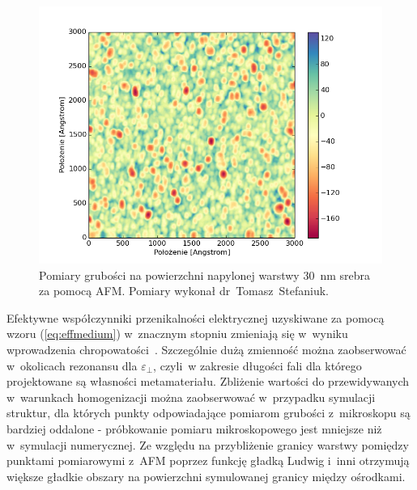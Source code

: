 \begin{figure}[bt]
		\includegraphics[width=\textwidth]{images/multilayer/ag30nm-afm-measure.png}
		\caption{Pomiary grubości na powierzchni napylonej warstwy $30$~nm srebra za pomocą AFM. Pomiary wykonał dr~Tomasz~Stefaniuk.} 
		\label{fig:ag30nm-afmmeasure}
\end{figure}


Efektywne współczynniki przenikalności elektrycznej uzyskiwane za pomocą wzoru (\ref{eq:effmedium}) w~znacznym stopniu zmieniają się w~wyniku wprowadzenia chropowatości~\cite{ludwig2012impactv}. Szczególnie dużą zmienność można zaobserwować w~okolicach rezonansu dla $\varepsilon_{\perp}$, czyli~w zakresie długości fali dla którego projektowane są własności metamateriału. Zbliżenie wartości do przewidywanych w~warunkach homogenizacji można zaobserwować w~przypadku symulacji struktur, dla których punkty odpowiadające pomiarom grubości z~mikroskopu są bardziej oddalone - próbkowanie pomiaru mikroskopowego jest mniejsze niż w~symulacji numerycznej. Ze względu na przybliżenie granicy warstwy pomiędzy punktami pomiarowymi z~AFM poprzez funkcję gładką Ludwig i~inni otrzymują większe gładkie obszary na powierzchni symulowanej granicy między ośrodkami. 

